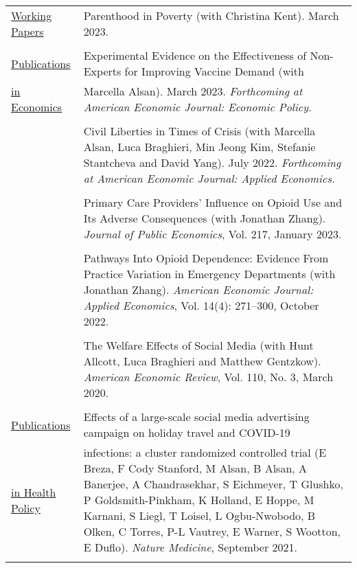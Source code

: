 \documentclass[letterpaper,11pt]{article}
\begin{document}
\begin{footnotesize}
{  \begin{tabularx}{\linewidth}{@{}
    >{\raggedright\arraybackslash\hsize=0.266\hsize}X 
    >{\raggedright\arraybackslash\hsize=1.733\hsize}X
  }
          \underline{Working Papers}  & Parenthood in Poverty (with Christina Kent). March 2023. \\
        & \\
\underline{Publications}    & Experimental Evidence on the Effectiveness of Non-Experts for Improving Vaccine Demand (with \\
\underline{in Economics} & Marcella Alsan). March 2023. \textit{Forthcoming at American Economic Journal: Economic Policy.} \\
        & \\
     & Civil Liberties in Times of Crisis (with Marcella Alsan, Luca Braghieri, Min Jeong Kim, Stefanie Stantcheva and David Yang). July 2022. \textit{Forthcoming at American Economic Journal: Applied Economics.} \\
                & \\
& Primary Care Providers’ Influence on Opioid Use and Its Adverse Consequences (with Jonathan Zhang). \textit{Journal of Public Economics}, Vol. 217, January 2023.   \\
        &  \\
& Pathways Into Opioid Dependence: Evidence From Practice Variation in Emergency Departments (with Jonathan Zhang). \textit{American Economic Journal: Applied Economics}, Vol. 14(4): 271–300, October 2022. \\  
        &  \\      
        & The Welfare Effects of Social Media (with Hunt Allcott, Luca Braghieri and Matthew Gentzkow). \textit{American Economic Review}, Vol. 110, No. 3, March 2020.  \\
        &  \\
 \underline{Publications}         & Effects of a large-scale social media advertising campaign on holiday travel and COVID-19 \\
 \underline{in Health Policy} &  infections: a cluster randomized controlled trial (E Breza, F Cody Stanford, M Alsan, B Alsan, A Banerjee, A Chandrasekhar, S Eichmeyer, T Glushko, P Goldsmith-Pinkham, K Holland, E Hoppe, M Karnani, S Liegl, T Loisel, L Ogbu-Nwobodo, B Olken, C Torres, P-L Vautrey, E Warner, S Wootton, E Duflo).  \textit{Nature Medicine}, September 2021.  \\
        &  \\

\end{tabularx}}
\end{footnotesize}
\end{document}
